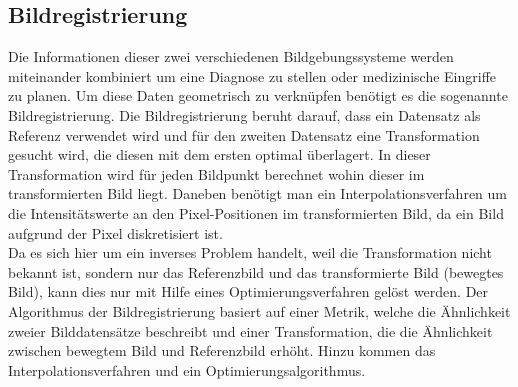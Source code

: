 \subsection{Bildregistrierung}
Die Informationen dieser zwei verschiedenen Bildgebungssysteme werden
miteinander kombiniert um eine Diagnose zu stellen oder medizinische Eingriffe
zu planen. Um diese Daten geometrisch zu verknüpfen benötigt es die sogenannte
Bildregistrierung. Die Bildregistrierung beruht darauf, dass ein Datensatz als
Referenz verwendet wird und für den zweiten Datensatz eine Transformation
gesucht wird, die diesen mit dem ersten optimal überlagert. In dieser
Transformation wird für jeden Bildpunkt berechnet wohin dieser im
transformierten Bild liegt. Daneben benötigt man ein Interpolationsverfahren
um die Intensitätswerte an den Pixel-Positionen im transformierten Bild, da
ein Bild aufgrund der Pixel diskretisiert ist.\\
Da es sich hier um ein inverses Problem handelt, weil die Transformation nicht
bekannt ist, sondern nur das Referenzbild und das transformierte Bild (bewegtes
Bild), kann dies nur mit Hilfe eines Optimierungsverfahren gelöst werden. 
Der Algorithmus der Bildregistrierung basiert auf einer Metrik, welche die
Ähnlichkeit zweier Bilddatensätze beschreibt und einer Transformation, die die
Ähnlichkeit zwischen bewegtem Bild und Referenzbild erhöht. Hinzu kommen das
Interpolationsverfahren und ein Optimierungsalgorithmus.

